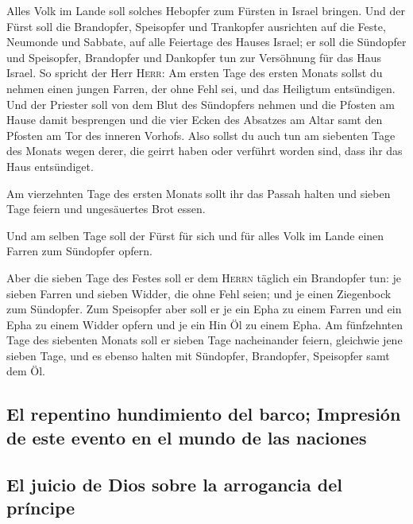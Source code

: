 Alles Volk im Lande soll solches Hebopfer zum Fürsten in Israel bringen.
 Und der Fürst soll die Brandopfer, Speisopfer und
Trankopfer ausrichten auf die Feste, Neumonde und Sabbate, auf alle
Feiertage des Hauses Israel; er soll die Sündopfer und Speisopfer,
Brandopfer und Dankopfer tun zur Versöhnung für das Haus Israel.
 So spricht der Herr \textsc{Herr}: Am ersten Tage des
ersten Monats sollst du nehmen einen jungen Farren, der ohne Fehl sei,
und das Heiligtum entsündigen.  Und der Priester soll von
dem Blut des Sündopfers nehmen und die Pfosten am Hause damit besprengen
und die vier Ecken des Absatzes am Altar samt den Pfosten am Tor des
inneren Vorhofs.  Also sollst du auch tun am siebenten
Tage des Monats wegen derer, die geirrt haben oder verführt worden sind,
dass ihr das Haus entsündiget.

 Am vierzehnten Tage des ersten Monats sollt ihr das
Passah halten und sieben Tage feiern und ungesäuertes Brot essen.

 Und am selben Tage soll der Fürst für sich und für alles
Volk im Lande einen Farren zum Sündopfer opfern.

 Aber die sieben Tage des Festes soll er dem
\textsc{Herrn} täglich ein Brandopfer tun: je sieben Farren und sieben
Widder, die ohne Fehl seien; und je einen Ziegenbock zum Sündopfer.
 Zum Speisopfer aber soll er je ein Epha zu einem Farren
und ein Epha zu einem Widder opfern und je ein Hin Öl zu einem Epha.
 Am fünfzehnten Tage des siebenten Monats soll er sieben
Tage nacheinander feiern, gleichwie jene sieben Tage, und es ebenso
halten mit Sündopfer, Brandopfer, Speisopfer samt dem Öl.

\hypertarget{el-repentino-hundimiento-del-barco-impresiuxf3n-de-este-evento-en-el-mundo-de-las-naciones}{%
\subsection{El repentino hundimiento del barco; Impresión de este evento
en el mundo de las
naciones}\label{el-repentino-hundimiento-del-barco-impresiuxf3n-de-este-evento-en-el-mundo-de-las-naciones}}

\hypertarget{el-juicio-de-dios-sobre-la-arrogancia-del-pruxedncipe}{%
\subsection{El juicio de Dios sobre la arrogancia del
príncipe}\label{el-juicio-de-dios-sobre-la-arrogancia-del-pruxedncipe}}


